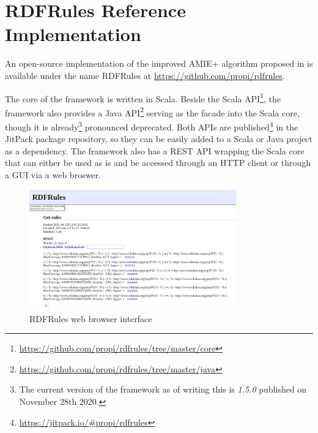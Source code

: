 \chapter{RDFRules Reference Implementation}

An open-source implementation of the improved AMIE+ algorithm proposed in \cite{Zeman2020} is available under the name RDFRules at \href{https://github.com/propi/rdfrules}{https://github.com/propi/rdfrules}.



The core of the framework is written in Scala. Beside the Scala API\footnote{\href{https://github.com/propi/rdfrules/tree/master/core}{https://github.com/propi/rdfrules/tree/master/core}}, the framework also provides a Java API\footnote{\href{https://github.com/propi/rdfrules/tree/master/java}{https://github.com/propi/rdfrules/tree/master/java}} serving as the facade into the Scala core, though it is already\footnote{The current version of the framework as of writing this is \textit{1.5.0} published on November 28th 2020.} pronounced deprecated. Both APIs are published\footnote{\href{https://jitpack.io/\#propi/rdfrules}{https://jitpack.io/\#propi/rdfrules}} in the JitPack package repository, so they can be easily added to a Scala or Java project as a dependency. The framework also has a REST API wrapping the Scala core that can either be used as is and be accessed through an HTTP client or through a GUI via a web broswer.

\begin{figure}[h]
\centering
\includegraphics[width=0.8\textwidth]{img/gui-getrules.png}
\caption{RDFRules web browser interface}
\label{rdfrulesgui}
\end{figure}

